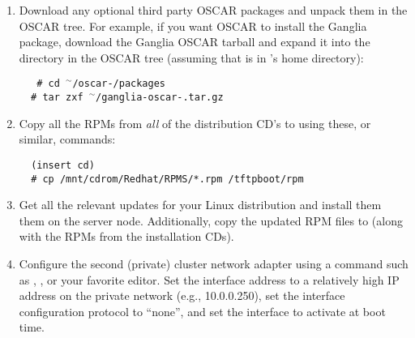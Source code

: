 \begin {enumerate}
\begin{verbatim}
  # cd
  # tar zxf <filename>
\end{verbatim}
  
  Where  is either
   (regular distribution) or
   (extra crispy
    distribution).

  
\item Download any optional third party OSCAR packages and unpack
  them in the OSCAR tree.  For example, if you want OSCAR to install
  the Ganglia package, download the Ganglia OSCAR tarball and expand
  it into the  directory in the OSCAR tree (assuming
  that  is in 's
  home directory):

\vspace{11pt}

{\tt 
\ \ \# cd $^{\sim}$/oscar-\oscarversion/packages \\
\indent \ \ \# tar zxf $^{\sim}$/ganglia-oscar-\oscarversion.tar.gz
}

\vspace{11pt}

  
\item Copy all the RPMs from \emph{all} of the distribution CD's to
   using these, or similar, commands:

\begin{verbatim}
  (insert cd)
  # cp /mnt/cdrom/Redhat/RPMS/*.rpm /tftpboot/rpm
\end{verbatim}

  
\item Get all the relevant updates for your Linux distribution and
  install them them on the server node.  Additionally, copy the
  updated RPM files to  (along with the RPMs from
  the installation CDs).
  
  
\item Configure the second (private) cluster network adapter using a
  command such as , , or your favorite editor.
  Set the interface address to a relatively high IP address on the
  private network (e.g., 10.0.0.250), set the interface configuration
  protocol to ``none'', and set the interface to activate at boot
  time.


\end{enumerate}
